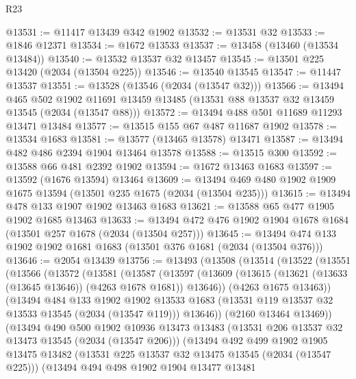 \begin{lexlean}{R23}
\begin{coremodule}
@13531 := @11417 @13439 @342 @1902
@13532 := @13531 @32
@13533 := @1846 @12371
@13534 := @1672 @13533
@13537 := @13458 (@13460 (@13534 @13484))
@13540 := @13532 @13537 @32 @13457
@13545 := @13501 @225 @13420 (@2034 (@13504 @225))
@13546 := @13540 @13545
@13547 := @11447 @13537
@13551 := @13528 (@13546 (@2034 (@13547 @32)))
@13566 := @13494
    @465
    @502
    @1902
    @11691
    @13459
    @13485
    (@13531 @88 @13537 @32 @13459 @13545 (@2034 (@13547 @88)))
@13572 := @13494 @488 @501 @11689 @11293 @13471 @13484
@13577 := @13515 @155 @67 @487 @11687 @1902
@13578 := @13534 @1683
@13581 := @13577 (@13465 @13578) @13471
@13587 := @13494 @482 @486 @2394 @1904 @13464 @13578
@13588 := @13515 @300
@13592 := @13588 @66 @481 @2392 @1902
@13594 := @1672 @13463 @1683
@13597 := @13592 (@1676 @13594) @13464
@13609 := @13494 @469 @480 @1902 @1909 @1675 @13594 (@13501 @235 @1675 (@2034 (@13504 @235)))
@13615 := @13494 @478 @133 @1907 @1902 @13463 @1683
@13621 := @13588 @65 @477 @1905 @1902 @1685 @13463
@13633 := @13494 @472 @476 @1902 @1904 @1678 @1684 (@13501 @257 @1678 (@2034 (@13504 @257)))
@13645 := @13494 @474 @133 @1902 @1902 @1681 @1683 (@13501 @376 @1681 (@2034 (@13504 @376)))
@13646 := @2054 @13439
@13756 := @13493
    (@13508
      (@13514
        (@13522
          (@13551
            (@13566
              (@13572
                (@13581
                  (@13587
                    (@13597
                      (@13609 (@13615 (@13621 (@13633 (@13645 @13646)) (@4263 @1678 @1681)) @13646))
                      (@4263 @1675 @13463))
                    (@13494
                      @484
                      @133
                      @1902
                      @1902
                      @13533
                      @1683
                      (@13531 @119 @13537 @32 @13533 @13545 (@2034 (@13547 @119)))
                      @13646))
                  (@2160 @13464 @13469))
                (@13494
                  @490
                  @500
                  @1902
                  @10936
                  @13473
                  @13483
                  (@13531 @206 @13537 @32 @13473 @13545 (@2034 (@13547 @206)))
                  (@13494
                    @492
                    @499
                    @1902
                    @1905
                    @13475
                    @13482
                    (@13531 @225 @13537 @32 @13475 @13545 (@2034 (@13547 @225)))
                    (@13494
                      @494
                      @498
                      @1902
                      @1904
                      @13477
                      @13481

\end{coremodule}
\end{lexlean}

